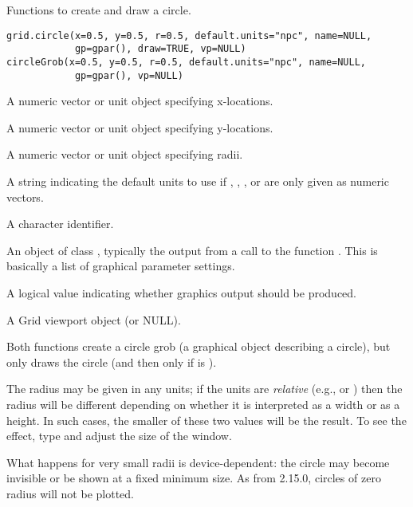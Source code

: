 %
\begin{Description}\relax
Functions to create and draw a circle.  
\end{Description}
%
\begin{Usage}
\begin{verbatim}
grid.circle(x=0.5, y=0.5, r=0.5, default.units="npc", name=NULL,
            gp=gpar(), draw=TRUE, vp=NULL)
circleGrob(x=0.5, y=0.5, r=0.5, default.units="npc", name=NULL,
            gp=gpar(), vp=NULL)
\end{verbatim}
\end{Usage}
%
\begin{Arguments}
\begin{ldescription}
\item[\code{x}] A numeric vector or unit object specifying x-locations.
\item[\code{y}] A numeric vector or unit object specifying y-locations.
\item[\code{r}] A numeric vector or unit object specifying radii.
\item[\code{default.units}] A string indicating the default units to use
if , , , or 
are only given as numeric vectors. 
\item[\code{name}]  A character identifier. 
\item[\code{gp}] An object of class , typically the output
from a call to the function .  This is basically
a list of graphical parameter settings.
\item[\code{draw}] A logical value indicating whether graphics output
should be produced.
\item[\code{vp}] A Grid viewport object (or NULL).
\end{ldescription}
\end{Arguments}
%
\begin{Details}\relax
Both functions create a circle grob (a graphical object describing a
circle), but only 
draws the circle (and then only if  is ).

The radius may be given in any
units;  if the units are \emph{relative} (e.g.,  or
) then the radius will be different depending on
whether it is interpreted as a width or as a height.  In such cases,
the smaller of these two values will be the result.  To see the
effect, type  and adjust the size of the window.

What happens for very small radii is device-dependent: the
circle may become invisible or be shown at a fixed minimum size.  As
from \R{} 2.15.0, circles of zero radius will not be plotted.
\end{Details}
